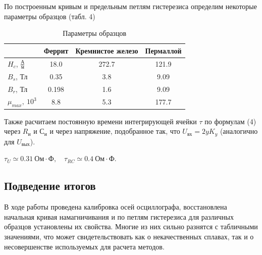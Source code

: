 \documentclass[12pt,a4paper]{article}
\begin{document}
По построенным кривым и предельным петлям гистерезиса определим некоторые параметры образцов (табл. 4)
\begin{table}[H]
    \centering
    \begin{tabular}[]{|l|c|c|c|}
        \hline
        &Феррит&Кремнистое железо&Пермаллой \\ \hline
        $H_c$, $\frac{А}{м}$ &18.0 &272.7&121.9\\ \hline
        $B_s$, Тл &0.35 &3.8&9.09 \\ \hline
        $B_r$, Тл &0.198 & 1.6&9.09 \\ \hline
        $\mu_{max},\ 10^{3}$  & 8.8 & 5.3 & 177.7 \\ \hline
    \end{tabular}
    \caption{Параметры образцов}
\end{table}

Также расчитаем постоянную времени интегрирующей ячейки $\tau$ по формулам (4) через $R_и$ и $С_и$ и через напряжение, подобранное так, что $U_{вх} = 2y K_y$ (аналогично для $U_{вых}$).

$\tau_U \simeq 0.31\ Ом \cdot Ф,\quad \tau_{RC} \simeq 0.4\ Ом \cdot Ф$.

\subsection*{Подведение итогов}
В ходе работы проведена калибровка осей осциллографа, восстановлена начальная кривая намагничивания и по петлям гистерезиса для различных образцов установлены их свойства. 
Многие из них сильно разнятся с табличными значениями, что может свидетельствовать как о некачественных сплавах, так и о несовершенстве используемых для расчета методов.
\end{document}
